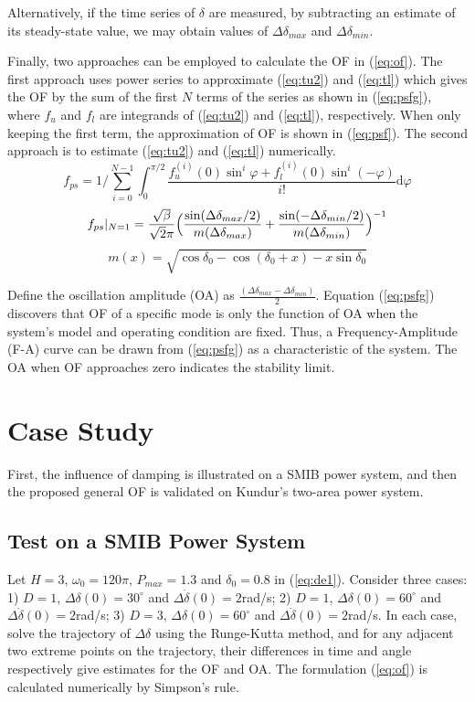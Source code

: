 \documentclass[journal]{IEEEtran}
\begin{document}
Alternatively, if the time series of $\delta$ are measured, by subtracting an estimate of its steady-state value, we may obtain values of $\Delta\delta_{max}$ and $\Delta\delta_{min}$.

Finally, two approaches can be employed to calculate the OF in (\ref{eq:of}). The first approach uses power series to approximate (\ref{eq:tu2}) and (\ref{eq:tl}) which gives the OF by the sum of the first $N$ terms of the series as shown in (\ref{eq:psfg}), where $f_{u}$ and $f_{l}$ are integrands of (\ref{eq:tu2}) and (\ref{eq:tl}), respectively. When only keeping the first term, the approximation of OF is shown in (\ref{eq:psf}). The second approach is to estimate (\ref{eq:tu2}) and (\ref{eq:tl}) numerically.
\begin{equation} \label{eq:psfg}
f_{ps}=1/\sum_{i=0}^{N-1}\int_{0}^{\pi/2}\frac{f_{u}^{(i)}(0)\sin^{i}\varphi+f_{l}^{(i)}(0)\sin^{i}(-\varphi)}{i!}\textrm{d}\varphi
\end{equation}
\begin{equation} \label{eq:psf}
f_{ps}|_{N=1}=\frac{\sqrt{\beta}}{\sqrt{2}\pi}\Bigl(\frac{\sin(\Delta\delta_{max}/2)}{m(\Delta\delta_{max})}
+\frac{\sin(-\Delta\delta_{min}/2)}{m(\Delta\delta_{min})}\Bigr)^{-1}
\end{equation}
\begin{equation} \label{eq:m}
m(x)=\sqrt{\cos \delta_{0}-\cos(\delta_{0}+x)-x\sin \delta_{0}}
\end{equation}

Define the oscillation amplitude (OA) as $\frac{(\Delta\delta_{max}-\Delta\delta_{min})}{2}$. Equation (\ref{eq:psfg}) discovers that OF of a specific mode is only the function of OA when the system’s model and operating condition are fixed. Thus, a Frequency-Amplitude (F-A) curve can be drawn from (\ref{eq:psfg}) as a characteristic of the system. The OA when OF approaches zero indicates the stability limit.

\section{Case Study}
First, the influence of damping is illustrated on a SMIB power system, and then the proposed general OF is validated on Kundur's two-area power system\cite{kundur}.

\subsection{Test on a SMIB Power System}
Let $H=3$, $\omega_{0}=120\pi$, $P_{max}=1.3$ and $\delta_{0}=0.8$ in (\ref{eq:de1}). Consider three cases: 1) $D=1$, $\Delta\delta(0)=30^{\circ}$ and $\Delta\dot{\delta}(0)=2$rad/s; 2) $D=1$, $\Delta\delta(0)=60^{\circ}$ and $\Delta\dot{\delta}(0)=2$rad/s; 3) $D=3$, $\Delta\delta(0)=60^{\circ}$ and $\Delta\dot{\delta}(0)=2$rad/s. In each case, solve the trajectory of $\Delta\delta$ using the Runge-Kutta method, and for any adjacent two extreme points on the trajectory, their differences in time and angle respectively give estimates for the OF and OA. The formulation (\ref{eq:of}) is calculated numerically by Simpson's rule.
\end{document}
